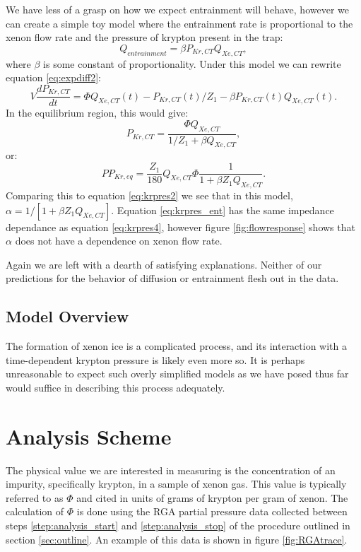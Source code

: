 \documentclass[12pt]{article}
\begin{document}
We have less of a grasp on how we expect entrainment will behave, however we can create a simple toy model where the entrainment rate is proportional to the xenon flow rate and the pressure of krypton present in the trap:
\begin{equation}
Q_{entrainment}=\beta P_{Kr,CT}Q_{Xe,CT},
\end{equation}
where $\beta$ is some constant of proportionality. Under this model we can rewrite equation \ref{eq:expdiff2}:
\begin{equation}
V\frac{dP_{Kr,CT}}{dt}=\Phi Q_{Xe,CT}(t)-P_{Kr,CT}(t)/Z_1-\beta P_{Kr,CT}(t)Q_{Xe,CT}(t).
\end{equation}
In the equilibrium region, this would give:
\begin{equation}
P_{Kr,CT}=\frac{\Phi Q_{Xe,CT}}{1/Z_1+\beta Q_{Xe,CT}},
\end{equation}
or:
\begin{equation}
\label{eq:krpres_ent}
PP_{Kr,eq}=\frac{Z_1}{180}Q_{Xe,CT}\Phi \frac{1}{1+\beta Z_1 Q_{Xe,CT}}.
\end{equation}
Comparing this to equation \ref{eq:krpres2} we see that in this model, $\alpha=1/[1+\beta Z_1 Q_{Xe,CT}]$. Equation \ref{eq:krpres_ent} has the same impedance dependance as equation \ref{eq:krpres4}, however figure \ref{fig:flowresponse} shows that $\alpha$ does not have a dependence on xenon flow rate.

Again we are left with a dearth of satisfying explanations. Neither of our predictions for the behavior of diffusion or entrainment flesh out in the data. 


\subsection{Model Overview}
The formation of xenon ice is a complicated process, and its interaction with a time-dependent krypton pressure is likely even more so. It is perhaps unreasonable to expect such overly simplified models as we have posed thus far would suffice in describing this process adequately.

\section{Analysis Scheme}
The physical value we are interested in measuring is the concentration of an impurity, specifically krypton, in a sample of xenon gas. This value is typically referred to as $\Phi$ and cited in units of grams of krypton per gram of xenon. The calculation of $\Phi$ is done using the RGA partial pressure data collected between steps \ref{step:analysis_start} and \ref{step:analysis_stop} of the procedure outlined in section \ref{sec:outline}. An example of this data is shown in figure \ref{fig:RGAtrace}. 
\end{document}

